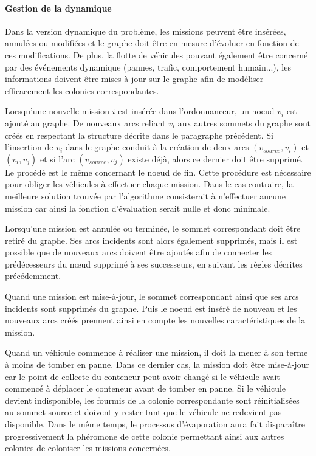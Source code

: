 \paragraph{Gestion de la dynamique}

Dans la version dynamique du problème, les missions peuvent être insérées, annulées ou modifiées et le graphe doit être en mesure d'évoluer en fonction de ces modifications. De plus, la flotte de véhicules pouvant également être concerné par des événements dynamique (pannes, trafic, comportement humain...), les informations doivent être mises-à-jour sur le graphe afin de modéliser efficacement les colonies correspondantes.

Lorsqu'une nouvelle mission $i$ est insérée dans l'ordonnanceur, un noeud $v_i$ est ajouté au graphe. De nouveaux arcs reliant $v_i$ aux autres sommets du graphe sont créés en respectant la structure décrite dans le paragraphe précédent. Si l'insertion de $v_i$ dans le graphe conduit à la création de deux arcs $(v_{source},v_i)$ et $(v_i,v_j)$ et si l'arc $(v_{source}, v_j)$ existe déjà, alors ce dernier doit être supprimé. Le procédé est le même concernant le noeud de fin. Cette procédure est nécessaire pour obliger les véhicules à effectuer chaque mission. Dans le cas contraire, la meilleure solution trouvée par l'algorithme consisterait à n'effectuer aucune mission car ainsi la fonction d'évaluation serait nulle et donc minimale.

Lorsqu'une mission est annulée ou terminée, le sommet correspondant doit être retiré du graphe. Ses arcs incidents sont alors également supprimés, mais il est possible que de nouveaux arcs doivent être ajoutés afin de connecter les prédécesseurs du n\oe{}ud supprimé à ses successeurs, en suivant les règles décrites précédemment.

Quand une mission est mise-à-jour, le sommet correspondant ainsi que ses arcs incidents sont supprimés du graphe. Puis le noeud est inséré de nouveau et les nouveaux arcs créés prennent ainsi en compte les nouvelles caractéristiques de la mission.

Quand un véhicule commence à réaliser une mission, il doit la mener à son terme à moins de tomber en panne. Dans ce dernier cas, la mission doit être mise-à-jour car le point de collecte du conteneur peut avoir changé si le véhicule avait commencé à déplacer le conteneur avant de tomber en panne. 
Si le véhicule devient indisponible, les fourmis de la colonie correspondante sont réinitialisées au sommet source et doivent y rester tant que le véhicule ne redevient pas disponible. Dans le même temps, le processus d'évaporation aura fait disparaître progressivement la phéromone de cette colonie permettant ainsi aux autres colonies de coloniser les missions concernées.


